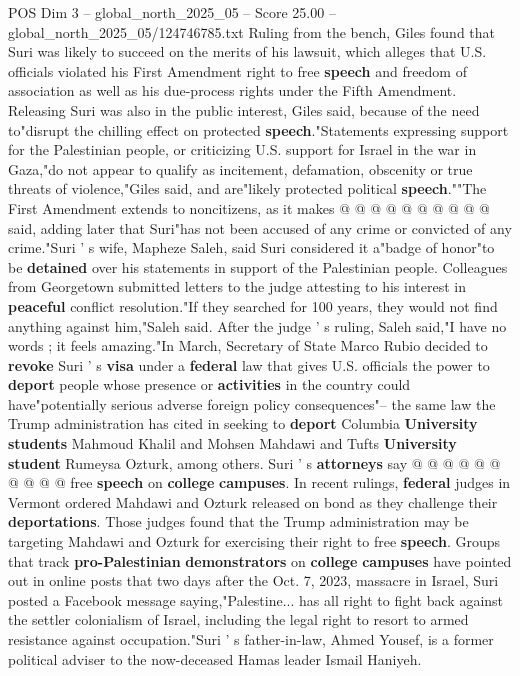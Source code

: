 \begin{textsample}{POS Dim 3 – global\_north\_2025\_05 – Score 25.00 – global\_north\_2025\_05/124746785.txt}
Ruling from the bench, Giles found that Suri was likely to succeed on the merits of his lawsuit, which alleges that U.S. officials violated his First Amendment right to free \textbf{speech} and freedom of association as well as his due-process rights under the Fifth Amendment.
Releasing Suri was also in the public interest, Giles said, because of the need to"disrupt the chilling effect on protected \textbf{speech}."Statements expressing support for the Palestinian people, or criticizing U.S. support for Israel in the war in Gaza,"do not appear to qualify as incitement, defamation, obscenity or true threats of violence,"Giles said, and are"likely protected political \textbf{speech}.""The First Amendment extends to noncitizens, as it makes @ @ @ @ @ @ @ @ @ @ said, adding later that Suri"has not been accused of any crime or convicted of any crime."Suri ' s wife, Mapheze Saleh, said Suri considered it a"badge of honor"to be \textbf{detained} over his statements in support of the Palestinian people.
Colleagues from Georgetown submitted letters to the judge attesting to his interest in \textbf{peaceful} conflict resolution."If they searched for 100 years, they would not find anything against him,"Saleh said.
After the judge ' s ruling, Saleh said,"I have no words ; it feels amazing."In March, Secretary of State Marco Rubio decided to \textbf{revoke} Suri ' s \textbf{visa} under a \textbf{federal} law that gives U.S. officials the power to \textbf{deport} people whose presence or \textbf{activities} in the country could have"potentially serious adverse foreign policy consequences"-- the same law the Trump administration has cited in seeking to \textbf{deport} Columbia \textbf{University} \textbf{students} Mahmoud Khalil and Mohsen Mahdawi and Tufts \textbf{University} \textbf{student} Rumeysa Ozturk, among others.
Suri ' s \textbf{attorneys} say @ @ @ @ @ @ @ @ @ @ free \textbf{speech} on \textbf{college} \textbf{campuses}.
In recent rulings, \textbf{federal} judges in Vermont ordered Mahdawi and Ozturk released on bond as they challenge their \textbf{deportations}.
Those judges found that the Trump administration may be targeting Mahdawi and Ozturk for exercising their right to free \textbf{speech}.
Groups that track \textbf{pro-Palestinian} \textbf{demonstrators} on \textbf{college} \textbf{campuses} have pointed out in online posts that two days after the Oct. 7, 2023, massacre in Israel, Suri posted a Facebook message saying,"Palestine... has all right to fight back against the settler colonialism of Israel, including the legal right to resort to armed resistance against occupation."Suri ' s father-in-law, Ahmed Yousef, is a former political adviser to the now-deceased Hamas leader Ismail Haniyeh.

\end{textsample}
